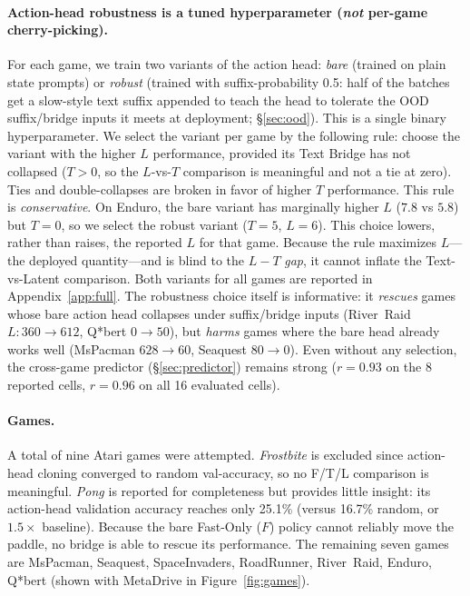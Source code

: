 \documentclass[11pt]{article}
\begin{document}
\paragraph{Action-head robustness is a tuned hyperparameter (\emph{not} per-game cherry-picking).}
\label{sec:setup_variant}
For each game, we train two variants of the action head: \emph{bare} (trained on plain 
state prompts) or \emph{robust} (trained with suffix-probability 0.5: half of the batches get a 
slow-style text suffix appended to teach the head to tolerate the OOD suffix/bridge inputs it 
meets at deployment; \S\ref{sec:ood}). This is a single binary hyperparameter. We select the 
variant per game by the following rule: choose the variant with the higher $L$ performance, 
provided its Text Bridge has not collapsed ($T\!>\!0$, so the $L$-vs-$T$ comparison is
meaningful and not a tie at zero). Ties and double-collapses are broken in favor of higher $T$ performance.
This rule is \emph{conservative}. On Enduro, the bare variant has marginally higher $L$ ($7.8$ 
vs $5.8$) but $T\!=\!0$, so we select the robust variant ($T\!=\!5$, $L\!=\!6$). This choice
lowers, rather than raises, the reported $L$ for that game. Because the rule maximizes $L$---
the deployed quantity---and is blind to the $L-T$ \emph{gap}, it cannot inflate the Text-vs-Latent
comparison. Both variants for all games are reported in Appendix~\ref{app:full}. The robustness 
choice itself is informative: it \emph{rescues} games whose bare action head collapses under 
suffix/bridge inputs (River~Raid $L\!:\!360\!\to\!612$, Q*bert $0\!\to\!50$), but \emph{harms} 
games where the bare head already works well (MsPacman $628\!\to\!60$, Seaquest $80\!\to\!0$). 
Even without any selection, the cross-game predictor (\S\ref{sec:predictor}) remains strong
($r=0.93$ on the 8 reported cells, $r=0.96$ on all 16 evaluated cells).

\paragraph{Games.} A total of nine Atari games were attempted. \emph{Frostbite} is excluded since action-head cloning converged to random val-accuracy, so no F/T/L comparison is meaningful. \emph{Pong} is reported for completeness but provides little insight: its action-head validation accuracy reaches only 25.1\% (versus 16.7\% random, or $1.5\times$ baseline). Because the bare Fast-Only ($F$) policy cannot reliably move the paddle, no bridge is able to rescue its performance. The remaining seven games are MsPacman, Seaquest, SpaceInvaders, RoadRunner, River~Raid, Enduro, Q*bert (shown with MetaDrive in Figure~\ref{fig:games}).
\end{document}
